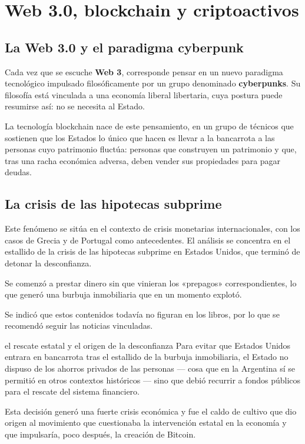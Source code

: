 \documentclass[12pt,oneside]{book}
\begin{document}
\chapter[Web 3.0 y blockchain]{Web 3.0, blockchain y criptoactivos}
\label{cap:web3}

\section{La Web 3.0 y el paradigma cyberpunk}

Cada vez que se escuche \textbf{Web 3}, corresponde pensar en un nuevo paradigma tecnológico impulsado filosóficamente por un grupo denominado \textbf{cyberpunks}. Su filosofía está vinculada a una economía liberal libertaria, cuya postura puede resumirse así: no se necesita al Estado.

\begin{important}
La tecnología blockchain nace de este pensamiento, en un grupo de técnicos que sostienen que los Estados lo único que hacen es llevar a la bancarrota a las personas cuyo patrimonio fluctúa: personas que construyen un patrimonio y que, tras una racha económica adversa, deben vender sus propiedades para pagar deudas.
\end{important}

\section{La crisis de las hipotecas subprime}

Este fenómeno se sitúa en el contexto de crisis monetarias internacionales, con los casos de Grecia y de Portugal como antecedentes. El análisis se concentra en el estallido de la crisis de las hipotecas subprime en Estados Unidos, que terminó de detonar la desconfianza.

Se comenzó a prestar dinero sin que vinieran los «prepagos» correspondientes, lo que generó una burbuja inmobiliaria que en un momento explotó.


\begin{note}
Se indicó que estos contenidos todavía no figuran en los libros, por lo que se recomendó seguir las noticias vinculadas.
\end{note}

\begin{example}{el rescate estatal y el origen de la desconfianza}
Para evitar que Estados Unidos entrara en bancarrota tras el estallido de la burbuja inmobiliaria, el Estado no dispuso de los ahorros privados de las personas --- cosa que en la Argentina sí se permitió en otros contextos históricos --- sino que debió recurrir a fondos públicos para el rescate del sistema financiero.

Esta decisión generó una fuerte crisis económica y fue el caldo de cultivo que dio origen al movimiento que cuestionaba la intervención estatal en la economía y que impulsaría, poco después, la creación de Bitcoin.
\end{example}
\end{document}
